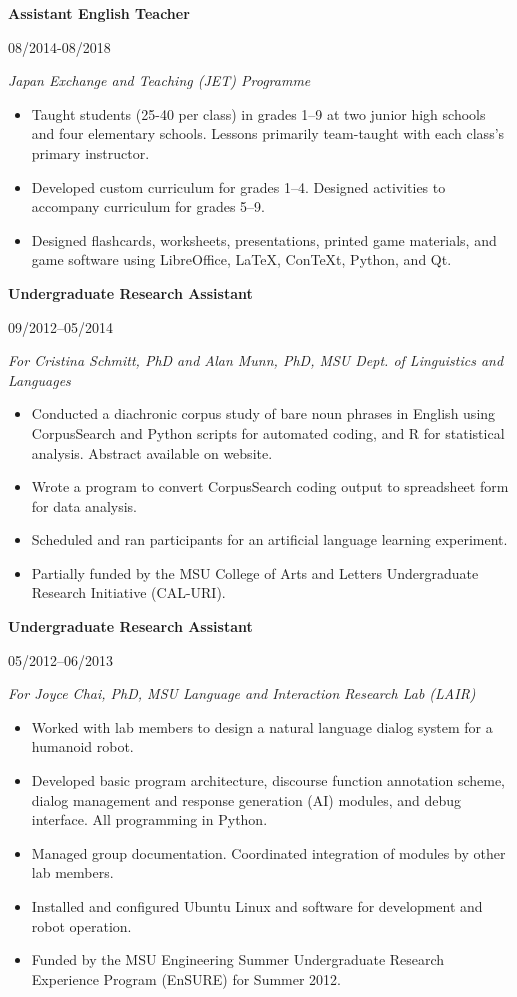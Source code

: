 \documentclass[10pt,oneside]{article}
\newcommand{\resbigitem}[4]{
	\item \parbox[t]{0.8\textwidth}{\textbf{#1}} \hfill #2 \\
		\parbox[t]{0.8\textwidth}{\textit{#3}} \hfill \textit{#4}
}
\begin{document}
\begin{reslist}
	\resbigitem{Assistant English Teacher}
		{08/2014-08/2018}
		{Japan Exchange and Teaching (JET) Programme}
		{}
	\begin{itemize}
		\item Taught students (25-40 per class) in grades 1--9 at two junior high schools and four elementary schools. Lessons primarily team-taught with each class's primary instructor.
		\item Developed custom curriculum for grades 1--4. Designed activities to accompany curriculum for grades 5--9.
		\item Designed flashcards, worksheets, presentations, printed game materials, and game software using LibreOffice, LaTeX, ConTeXt, Python, and Qt.
	\end{itemize}

	\resbigitem{Undergraduate Research Assistant}
		{09/2012--05/2014}
		{For Cristina Schmitt, PhD and Alan Munn, PhD, MSU Dept. of Linguistics and Languages}
		{}
	\begin{itemize}
		\item Conducted a diachronic corpus study of bare noun phrases in English using CorpusSearch and Python scripts for automated coding, and R for statistical analysis. Abstract available on website.
		\item Wrote a program to convert CorpusSearch coding output to spreadsheet form for data analysis.
		\item Scheduled and ran participants for an artificial language learning experiment.
		\item Partially funded by the MSU College of Arts and Letters Undergraduate Research Initiative (CAL-URI).
	\end{itemize}
	
	\resbigitem{Undergraduate Research Assistant}
		{05/2012--06/2013}
		{For Joyce Chai, PhD, MSU Language and Interaction Research Lab (LAIR)}
		{}
	\begin{itemize}
		\item Worked with lab members to design a natural language dialog system for a humanoid robot.
		\item Developed basic program architecture, discourse function annotation scheme, dialog management and response generation (AI) modules, and debug interface. All programming in Python.
		\item Managed group documentation. Coordinated integration of modules by other lab members.
		\item Installed and configured Ubuntu Linux and software for development and robot operation.
		\item Funded by the MSU Engineering Summer Undergraduate Research Experience Program (EnSURE) for Summer 2012.
	\end{itemize}
	

\end{reslist}
\end{document}
